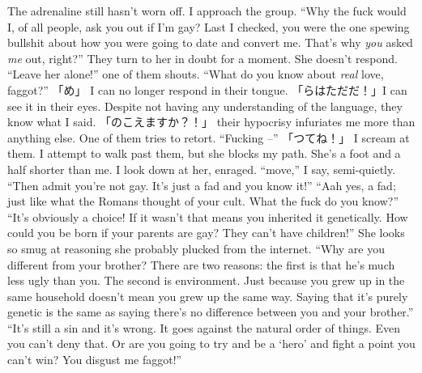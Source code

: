 \documentclass[a4paper, 12pt]{book}
\begin{document}
\begin{CJK*}{UTF8}{min}
\newline
\tab
The adrenaline still hasn’t worn off. I approach the group. ``Why the fuck would I, of all people, ask you out if I’m gay? Last I checked, you were the one spewing bullshit about how you were going to date and convert me. That’s why \textit{you} asked \textit{me} out, right?'' They turn to her in doubt for a moment. She doesn’t respond.
\newline
\tab
``Leave her alone!'' one of them shouts. ``What do you know about \textit{real} love, faggot?''
\newline
\tab
「め」 I can no longer respond in their tongue. 「らはただだ！」I can see it in their eyes. Despite not having any understanding of the language, they know what I said. 「のこえますか？！」 their hypocrisy infuriates me more than anything else. 
\newline
\tab
One of them tries to retort. ``Fucking --''
\newline
\tab
「つてね！」 I scream at them. I attempt to walk past them, but she blocks my path. She’s a foot and a half shorter than me. I look down at her, enraged. ``move,'' I say, semi-quietly.
\newline
\tab
``Then admit you’re not gay. It’s just a fad and you know it!''
\newline
\tab
``Aah yes, a fad; just like what the Romans thought of your cult. What the fuck do you know?''
\newline
\tab
``It’s obviously a choice! If it wasn’t that means you inherited it genetically. How could you be born if your parents are gay? They can’t have children!'' She looks so smug at reasoning she probably plucked from the internet.
\newline
\tab
``Why are you different from your brother? There are two reasons: the first is that he’s much less ugly than you. The second is environment. Just because you grew up in the same household doesn’t mean you grew up the same way. Saying that it’s purely genetic is the same as saying there’s no difference between you and your brother.''
\newline
\tab
``It’s still a sin and it’s wrong. It goes against the natural order of things. Even you can’t deny that. Or are you going to try and be a ‘hero’ and fight a point you can’t win? You disgust me faggot!'' 

\end{CJK*}
\end{document}

